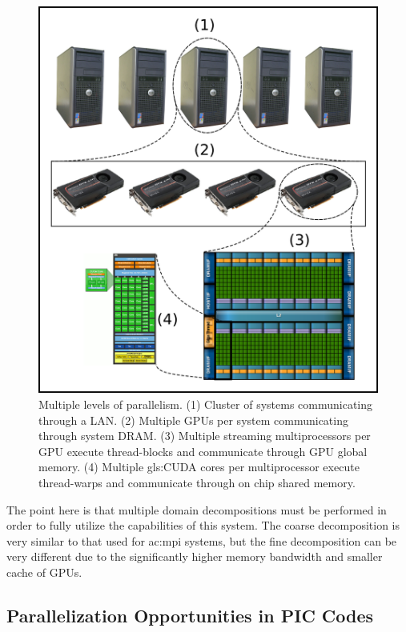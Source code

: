 \begin{figure}
\begin{center}
\includegraphics[width=5in]{introduction/multi_parallel.png}
\end{center}
\caption[Multiple levels of parallelism.]{Multiple levels of parallelism. (1) Cluster of systems communicating through a LAN. (2) Multiple GPUs per system communicating through system DRAM. (3) Multiple streaming multiprocessors per GPU execute thread-blocks and communicate through GPU global memory. (4) Multiple \gls{gls:CUDA} cores per multiprocessor execute thread-warps and communicate through on chip shared memory. }
\label{fig:multiparallel}
\end{figure}

The point here is that multiple domain decompositions must be performed in order to fully utilize the capabilities of this system. The coarse decomposition is very similar to that used for \gls{ac:mpi} systems, but the fine decomposition can be very different due to the significantly higher memory bandwidth and smaller cache of GPUs. 

		\subsection{Parallelization Opportunities in PIC Codes}

